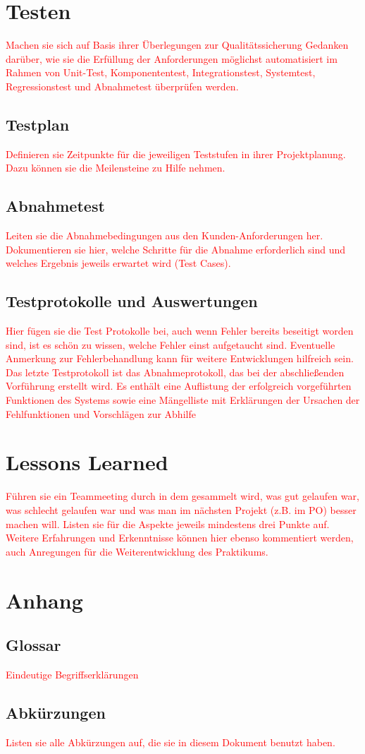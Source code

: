 \documentclass[a4paper, 11pt]{article}
\begin{document}
\section{Testen}
\textcolor{red}{Machen sie sich auf Basis ihrer Überlegungen zur Qualitätssicherung Gedanken darüber, wie sie die Erfüllung der Anforderungen möglichst automatisiert im Rahmen von Unit-Test, Komponententest, Integrationstest, Systemtest, Regressionstest und Abnahmetest überprüfen werden.}

\subsection{Testplan}
\textcolor{red}{Definieren sie Zeitpunkte für die jeweiligen Teststufen in ihrer Projektplanung. Dazu können sie die Meilensteine zu Hilfe nehmen.}

\subsection{Abnahmetest}
\textcolor{red}{Leiten sie die Abnahmebedingungen aus den Kunden-Anforderungen her. Dokumentieren sie hier, welche Schritte für die Abnahme erforderlich sind und welches Ergebnis jeweils erwartet wird (Test Cases).}

\subsection{Testprotokolle und Auswertungen}
\textcolor{red}{Hier fügen sie die Test Protokolle bei, auch wenn Fehler bereits beseitigt worden sind, ist es schön zu wissen, welche Fehler einst aufgetaucht sind. Eventuelle Anmerkung zur Fehlerbehandlung kann für weitere Entwicklungen hilfreich sein.
Das letzte Testprotokoll ist das Abnahmeprotokoll, das bei der abschließenden Vorführung erstellt wird. Es enthält eine Auflistung der erfolgreich vorgeführten Funktionen des Systems sowie eine Mängelliste mit Erklärungen der Ursachen der Fehlfunktionen und Vorschlägen zur Abhilfe
}

\section{Lessons Learned}
\textcolor{red}{Führen sie ein Teammeeting durch in dem gesammelt wird, was gut gelaufen war, was schlecht gelaufen war und was man im nächsten Projekt (z.B. im PO) besser machen will. Listen sie für die Aspekte jeweils mindestens drei Punkte auf. Weitere Erfahrungen und Erkenntnisse können hier ebenso kommentiert werden, auch Anregungen für die Weiterentwicklung des Praktikums.}

\section{Anhang}

\subsection{Glossar}
\textcolor{red}{Eindeutige Begriffserklärungen}

\subsection{Abkürzungen}
\textcolor{red}{Listen sie alle Abkürzungen auf, die sie in diesem Dokument benutzt haben.}
\end{document}
